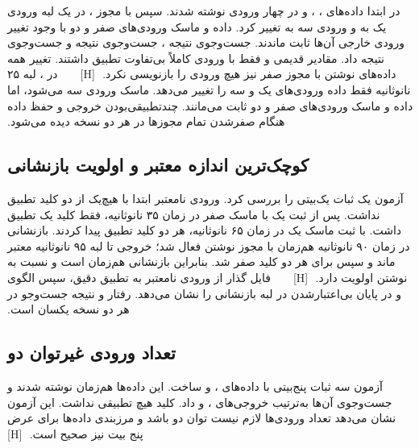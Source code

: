 ‫
‫در  ابتدا داده‌های ، ،  و  در چهار ورودی نوشته شدند. سپس با مجوز ، در یک لبه ورودی یک به  و ورودی سه به  تغییر کرد. داده و ماسک ورودی‌های صفر و دو با وجود تغییر ورودی خارجی آن‌ها ثابت ماندند. جست‌وجوی  نتیجه ، جست‌وجوی  نتیجه  و جست‌وجوی  نتیجه  داد. مقادیر قدیمی  و  فقط با ورودی کاملاً بی‌تفاوت تطبیق داشتند. تغییر همه داده‌های نوشتن با مجوز صفر نیز هیچ ورودی را بازنویسی نکرد.
‫
‫[H]
‫
‫
‫
‫
‫
‫در ، لبه ۲۵ نانوثانیه فقط داده ورودی‌های یک و سه را تغییر می‌دهد. ماسک ورودی سه  می‌شود، اما داده و ماسک ورودی‌های صفر و دو ثابت می‌مانند. چندتطبیقی‌بودن خروجی و حفظ داده هنگام صفرشدن تمام مجوزها در هر دو نسخه دیده می‌شود.
‫
‫\subsection{کوچک‌ترین اندازه معتبر و اولویت بازنشانی}
‫
‫آزمون  یک ثبات یک‌بیتی را بررسی کرد. ورودی نامعتبر ابتدا با هیچ‌یک از دو کلید تطبیق نداشت. پس از ثبت یک با ماسک صفر در زمان ۳۵ نانوثانیه، فقط کلید یک تطبیق داشت. با ثبت ماسک یک در زمان ۶۵ نانوثانیه، هر دو کلید تطبیق پیدا کردند. بازنشانی در زمان ۹۰ نانوثانیه هم‌زمان با مجوز نوشتن فعال شد؛ خروجی تا لبه ۹۵ نانوثانیه معتبر ماند و سپس برای هر دو کلید صفر شد. بنابراین بازنشانی هم‌زمان است و نسبت به نوشتن اولویت دارد.
‫
‫[H]
‫
‫
‫
‫
‫
‫فایل  گذار از ورودی نامعتبر به تطبیق دقیق، سپس الگوی  و در پایان بی‌اعتبارشدن در لبه بازنشانی را نشان می‌دهد. رفتار  و نتیجه جست‌وجو در هر دو نسخه یکسان است.
‫
‫\subsection{تعداد ورودی غیرتوان دو}
‫
‫آزمون  سه ثبات پنج‌بیتی با داده‌های ،  و  ساخت. این داده‌ها هم‌زمان نوشته شدند و جست‌وجوی آن‌ها به‌ترتیب خروجی‌های ،  و  داد. کلید  هیچ تطبیقی نداشت. این آزمون نشان می‌دهد تعداد ورودی‌ها لازم نیست توان دو باشد و مرزبندی داده‌ها برای عرض پنج بیت نیز صحیح است.
‫
‫[H]
‫
‫
